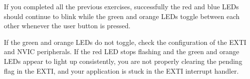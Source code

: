 \documentclass[11pt,fleqn]{book} %
\newcommand{\code}[3]{
    \begin{figure}[]
        \colorbox{gray!20!white}{
            \parbox{\linewidth-2\fboxsep} {
                \centering 
                
            }
        }
        \caption{#2}
        \label{#3}
    \end{figure}
}
\begin{document}
\begin{exercise}
    \noindent If you completed all the previous exercises, successfully the red and blue LEDs should continue to blink while the green and orange LEDs toggle between each other whenever the user button is pressed. 
    
    If the green and orange LEDs do not toggle, check the configuration of the EXTI and NVIC peripherals. If the red LED stops flashing and the green and orange LEDs appear to light up consistently, you are not properly clearing the pending flag in the EXTI, and your application is stuck in the EXTI interrupt handler.
    
\end{exercise}


%    
%    
%    
%    
\end{document}
